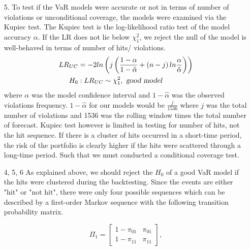 \documentclass[a4paper,11pt]{article}
\begin{document}
\begin{flushleft}
\begin{itemize}
\item[5.]To test if the VaR models were accurate or not in terms of number of violations or unconditional coverage, the models were examined via the Kupiec test. The Kupiec test is the log-likelihood ratio test of the model accuracy $\alpha$. If the LR does not lie below  $\chi^2_1$, we reject the null of the model is well-behaved in terms of number of hits/ violations. 
\begin{align*}
LR_{UC} &= -2ln\left(j\left(\frac{1-\alpha}{1-\hat{\alpha}} + \left(n - j\right)ln\frac{\alpha}{\hat{\alpha}}\right)\right)\\
H_0 &: LR_{UC} \sim \chi^2_1, \textsl{		good model}\\
\end{align*}
where $\alpha$ was the model confidence interval and $1 - \hat{\alpha}$ was the observed violations frequency.  $1 - \hat{\alpha}$  for our models would be $\frac{j}{1536}$ where $j$ was the total number of violations and 1536 was the rolling window times the total number of forecast. Kupiec test however is limited in testing for number of hits, not the hit sequence. If there is a cluster of hits occurred in a short-time period, the risk of the portfolio is clearly higher if the hits were scattered through a long-time period. Such that we must conducted a conditional coverage test.

 
\item[4, 5, 6]  As explained above, we should reject the $H_0$ of a good VaR model if the hits were clustered during the backtesting. Since the events are either "hit" or "not hit", there were only four possible sequences which can be described by a first-order Markov sequence with the following transition probability matrix. 
 
 \begin{equation*}
 {\Pi_1} = \begin{bmatrix} {1-\pi_{01}} & \pi_{01} \\
  {1-\pi_{11}} & \pi_{11}  \end{bmatrix},
 \end{equation*}
 

\end{itemize}
\end{flushleft}
\end{document}
